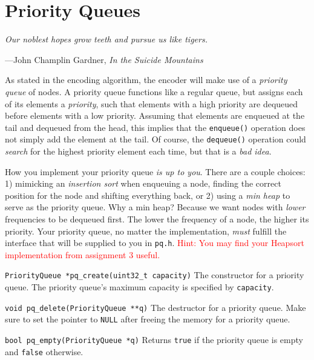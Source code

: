 \section{Priority Queues}
\textwidth
\epigraph{\emph{Our noblest hopes grow teeth and pursue us like tigers.}}
{---John Champlin Gardner, \emph{In the Suicide Mountains}}

As stated in the encoding algorithm, the encoder will make use of a
\emph{priority queue} of nodes. A priority queue functions like a
regular queue, but assigns each of its elements a \emph{priority}, such
that elements with a high priority are dequeued before elements with a
low priority. Assuming that elements are enqueued at the tail and
dequeued from the head, this implies that the \texttt{enqueue()}
operation does not simply add the element at the tail. Of course, the
\texttt{dequeue()} operation could \emph{search} for the highest
priority element each time, but that is a \emph{bad idea}.

How you implement your priority queue \emph{is up to you}. There are a
couple choices: 1) mimicking an \emph{insertion sort} when enqueuing a
node, finding the correct position for the node and shifting everything
back, or 2) using a \emph{min heap} to serve as the priority queue. Why
a min heap? Because we want nodes with \emph{lower} frequencies to be
dequeued first. The lower the frequency of a node, the higher its
priority. Your priority queue, no matter the implementation, \emph{must}
fulfill the interface that will be supplied to you in \texttt{pq.h}.
\textcolor{red}{Hint: You may find your Heapsort implementation from
assignment 3 useful.}

\begin{funcdoc}{\texttt{PriorityQueue *pq\_create(uint32\_t capacity)}}
  The constructor for a priority queue. The priority queue's maximum
  capacity is specified by \texttt{capacity}.
\end{funcdoc}

\begin{funcdoc}{\texttt{void pq\_delete(PriorityQueue **q)}}
  The destructor for a priority queue. Make sure to set the pointer to
  \texttt{NULL} after freeing the memory for a priority queue.
\end{funcdoc}

\begin{funcdoc}{\texttt{bool pq\_empty(PriorityQueue *q)}}
  Returns \texttt{true} if the priority queue is empty and \texttt{false}
  otherwise.
\end{funcdoc}

